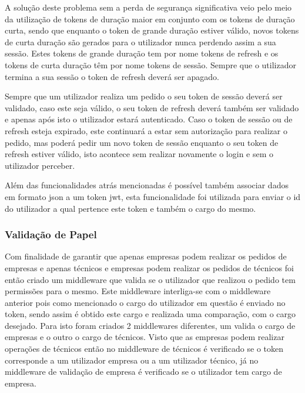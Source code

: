 A solução deste problema sem a perda de segurança significativa veio pelo meio da utilização de tokens de duração maior em conjunto com os tokens de duração curta, sendo que enquanto o token de grande duração estiver válido, novos tokens de curta duração são gerados para o utilizador nunca perdendo assim a sua sessão. Estes tokens de grande duração tem por nome tokens de refresh e os tokens de curta duração têm por nome tokens de sessão. Sempre que o utilizador termina a sua sessão o token de refresh deverá ser apagado.

Sempre que um utilizador realiza um pedido o seu token de sessão deverá ser validado, caso este seja válido, o seu token de refresh deverá também ser validado e apenas após isto o utilizador estará autenticado. Caso o token de sessão ou de refresh esteja expirado, este continuará a estar sem autorização para realizar o pedido, mas poderá pedir um novo token de sessão enquanto o seu token de refresh estiver válido, isto acontece sem realizar novamente o login e sem o utilizador perceber.

 Além das funcionalidades atrás mencionadas é possível também associar dados em formato json a um token jwt, esta funcionalidade foi utilizada para enviar o id do utilizador a qual pertence este token e também o cargo do mesmo.

 \newpage

\subsubsection{Validação de Papel}

Com finalidade de garantir que apenas empresas podem realizar os pedidos de empresas e apenas técnicos e empresas podem realizar os pedidos de técnicos foi então criado um middleware que valida se o utilizador que realizou o pedido tem permissões para o mesmo. Este middleware interliga-se com o middleware anterior pois como mencionado o cargo do utilizador em questão é enviado no token, sendo assim é obtido este cargo e realizada uma comparação, com o cargo desejado. Para isto foram criados 2 middlewares diferentes, um valida o cargo de empresas e o outro o cargo de técnicos. Visto que as empresas podem realizar operações de técnicos então no middleware de técnicos é verificado se o token corresponde a um utilizador empresa ou a um utilizador técnico, já no middleware de validação de empresa é verificado se o utilizador tem cargo de empresa.


